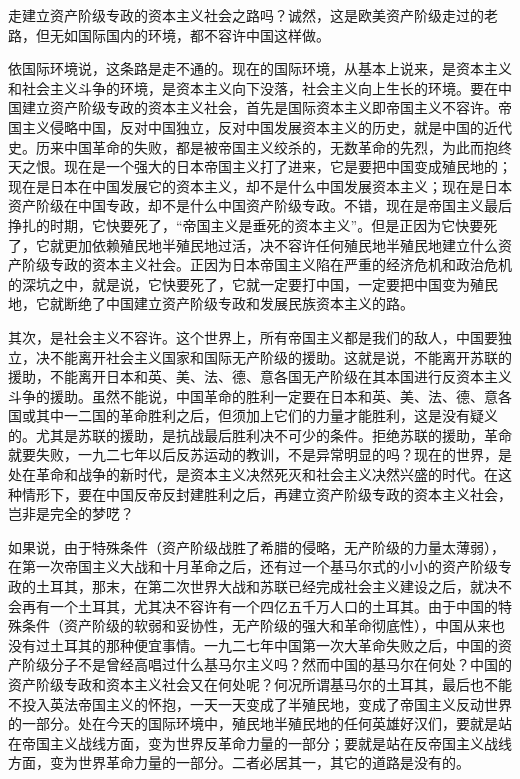 走建立资产阶级专政的资本主义社会之路吗？诚然，这是欧美资产阶级走过的老路，但无如国际国内的环境，都不容许中国这样做。

依国际环境说，这条路是走不通的。现在的国际环境，从基本上说来，是资本主义和社会主义斗争的环境，是资本主义向下没落，社会主义向上生长的环境。要在中国建立资产阶级专政的资本主义社会，首先是国际资本主义即帝国主义不容许。帝国主义侵略中国，反对中国独立，反对中国发展资本主义的历史，就是中国的近代史。历来中国革命的失败，都是被帝国主义绞杀的，无数革命的先烈，为此而抱终天之恨。现在是一个强大的日本帝国主义打了进来，它是要把中国变成殖民地的；现在是日本在中国发展它的资本主义，却不是什么中国发展资本主义；现在是日本资产阶级在中国专政，却不是什么中国资产阶级专政。不错，现在是帝国主义最后挣扎的时期，它快要死了，“帝国主义是垂死的资本主义”。但是正因为它快要死了，它就更加依赖殖民地半殖民地过活，决不容许任何殖民地半殖民地建立什么资产阶级专政的资本主义社会。正因为日本帝国主义陷在严重的经济危机和政治危机的深坑之中，就是说，它快要死了，它就一定要打中国，一定要把中国变为殖民地，它就断绝了中国建立资产阶级专政和发展民族资本主义的路。

其次，是社会主义不容许。这个世界上，所有帝国主义都是我们的敌人，中国要独立，决不能离开社会主义国家和国际无产阶级的援助。这就是说，不能离开苏联的援助，不能离开日本和英、美、法、德、意各国无产阶级在其本国进行反资本主义斗争的援助。虽然不能说，中国革命的胜利一定要在日本和英、美、法、德、意各国或其中一二国的革命胜利之后，但须加上它们的力量才能胜利，这是没有疑义的。尤其是苏联的援助，是抗战最后胜利决不可少的条件。拒绝苏联的援助，革命就要失败，一九二七年以后反苏运动的教训，不是异常明显的吗？现在的世界，是处在革命和战争的新时代，是资本主义决然死灭和社会主义决然兴盛的时代。在这种情形下，要在中国反帝反封建胜利之后，再建立资产阶级专政的资本主义社会，岂非是完全的梦呓？

如果说，由于特殊条件（资产阶级战胜了希腊的侵略，无产阶级的力量太薄弱），在第一次帝国主义大战和十月革命之后，还有过一个基马尔式的小小的资产阶级专政的土耳其，那末，在第二次世界大战和苏联已经完成社会主义建设之后，就决不会再有一个土耳其，尤其决不容许有一个四亿五千万人口的土耳其。由于中国的特殊条件（资产阶级的软弱和妥协性，无产阶级的强大和革命彻底性），中国从来也没有过土耳其的那种便宜事情。一九二七年中国第一次大革命失败之后，中国的资产阶级分子不是曾经高唱过什么基马尔主义吗？然而中国的基马尔在何处？中国的资产阶级专政和资本主义社会又在何处呢？何况所谓基马尔的土耳其，最后也不能不投入英法帝国主义的怀抱，一天一天变成了半殖民地，变成了帝国主义反动世界的一部分。处在今天的国际环境中，殖民地半殖民地的任何英雄好汉们，要就是站在帝国主义战线方面，变为世界反革命力量的一部分；要就是站在反帝国主义战线方面，变为世界革命力量的一部分。二者必居其一，其它的道路是没有的。

